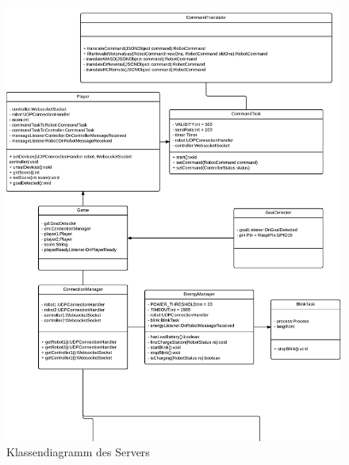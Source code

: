 \begin{figure}
	\includegraphics[page=2,width=\textwidth]{images/uml_software_all.pdf}
	
	\caption{Klassendiagramm des Servers}
	\label{fig:server_uml_all}
\end{figure}


